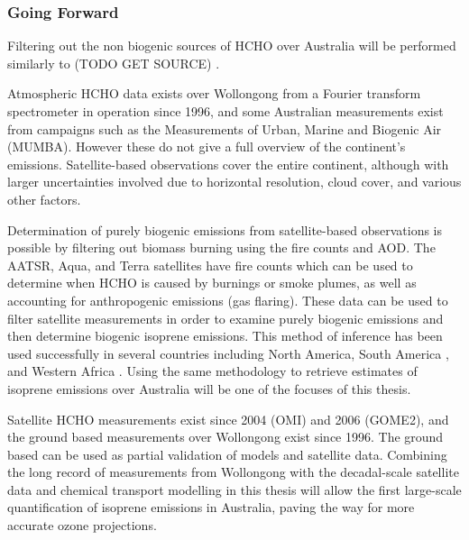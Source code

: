 \subsubsection{Going Forward}

Filtering out the non biogenic sources of HCHO over Australia will be performed similarly to (TODO GET SOURCE) \cite{Marais_2012}. 

Atmospheric HCHO data exists over Wollongong from a Fourier transform spectrometer in operation since 1996, and some Australian measurements exist from campaigns such as the Measurements of Urban, Marine and Biogenic Air (MUMBA).
However these do not give a full overview of the continent's emissions. Satellite-based observations cover the entire continent, although with larger uncertainties involved due to horizontal resolution, cloud cover, and various other factors. 

Determination of purely biogenic emissions from satellite-based observations is possible by filtering out biomass burning using the fire counts and AOD.
The AATSR, Aqua, and Terra satellites have fire counts which can be used to determine when HCHO is caused by burnings or smoke plumes, as well as accounting for anthropogenic emissions (gas flaring).
These data can be used to filter satellite measurements in order to examine purely biogenic emissions and then determine biogenic isoprene emissions.
This method of inference has been used successfully in several countries including North America\cite{Palmer_2003}, South America \cite{Barkley_2013}, and Western Africa \cite{Marais_2012}.
Using the same methodology to retrieve estimates of isoprene emissions over Australia will be one of the focuses of this thesis.

Satellite HCHO measurements exist since 2004 (OMI) and 2006 (GOME2), and the ground based measurements over Wollongong exist since 1996. The ground based can be used as partial validation of models and satellite data. 
Combining the long record of measurements from Wollongong with the decadal-scale satellite data and chemical transport modelling in this thesis will allow the first large-scale quantification of isoprene emissions in Australia, paving the way for more accurate ozone projections.
